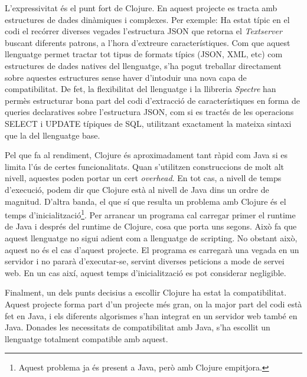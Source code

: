 L'expressivitat és el punt fort de Clojure. En aquest projecte es tracta amb estructures de dades dinàmiques i complexes. Per exemple: Ha estat típic en el codi el recórrer diverses vegades l'estructura JSON que retorna el \emph{Textserver} buscant diferents patrons, a l'hora d'extreure característiques. Com que aquest llenguatge permet tractar tot tipus de formats típics (JSON, XML, etc) com estructures de dades natives del llenguatge, s'ha pogut treballar directament sobre aquestes estructures sense haver d'intoduir una nova capa de compatibilitat. De fet, la flexibilitat del llenguatge i la llibreria \emph{Spectre} han permès estructurar bona part del codi d'extracció de característiques en forma de queries declaratives sobre l'estructura JSON, com si es tractés de les operacions SELECT i UPDATE típiques de SQL, utilitzant exactament la mateixa sintaxi que la del llenguatge base.

Pel que fa al rendiment, Clojure és aproximadament tant ràpid com Java si es limita l'ús de certes funcionalitats. Quan s'utilitzen construccions de molt alt nivell, aquestes poden portar un cert \emph{overhead}. En tot cas, a nivell de temps d'execució, podem dir que Clojure està al nivell de Java dins un ordre de magnitud. D'altra banda, el que sí que resulta un problema amb Clojure és el temps d'inicialització\footnote{Aquest problema ja és present a Java, però amb Clojure empitjora.}. Per arrancar un programa cal carregar primer el runtime de Java i després del runtime de Clojure, cosa que porta uns segons. Això fa que aquest llenguatge no sigui adient com a llenguatge de scripting. No obstant això, aquest no és el cas d'aquest projecte. El programa es carregarà una vegada en un servidor i no pararà d'executar-se, servint diverses peticions a mode de servei web. En un cas així, aquest temps d'inicialització es pot considerar negligible.

Finalment, un dels punts decisius a escollir Clojure ha estat la compatibilitat. Aquest projecte forma part d'un projecte més gran, on la major part del codi està fet en Java, i els diferents algorismes s'han integrat en un servidor web també en Java. Donades les necessitats de compatibilitat amb Java, s'ha escollit un llenguatge totalment compatible amb aquest.

